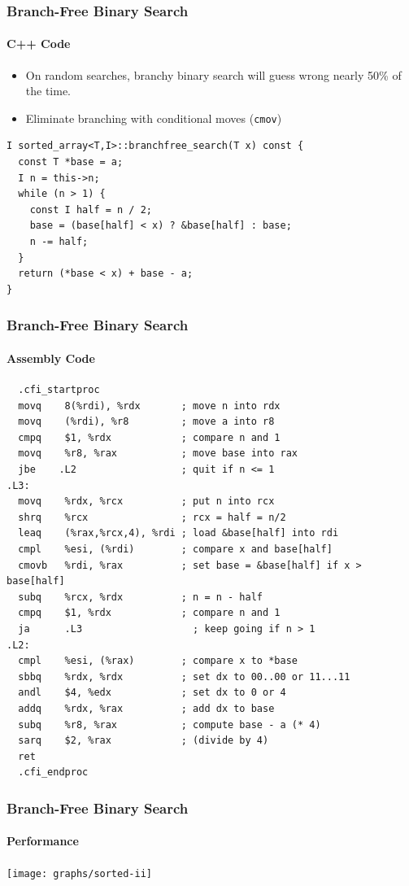 \documentclass[xcolor=dvipsnames]{beamer}
\begin{document}
\begin{frame}[fragile]
   \frametitle{Branch-Free Binary Search}
   \framesubtitle{C++ Code}

   \begin{itemize}
       \item On random searches, branchy binary search will guess 
                wrong nearly 50\% of the time.
       \item Eliminate branching with conditional moves (\texttt{\color{blue}cmov})
   \end{itemize}
\begin{verbatim}
I sorted_array<T,I>::branchfree_search(T x) const {
  const T *base = a;
  I n = this->n;
  while (n > 1) {
    const I half = n / 2;
    base = (base[half] < x) ? &base[half] : base;
    n -= half;
  }
  return (*base < x) + base - a;
}
\end{verbatim}
\end{frame}

\begin{frame}[fragile]
   \frametitle{Branch-Free Binary Search}
   \framesubtitle{Assembly Code}

\tiny
\begin{verbatim}
  .cfi_startproc
  movq    8(%rdi), %rdx       ; move n into rdx
  movq    (%rdi), %r8         ; move a into r8
  cmpq    $1, %rdx            ; compare n and 1
  movq    %r8, %rax           ; move base into rax
  jbe    .L2                  ; quit if n <= 1
.L3:
  movq    %rdx, %rcx          ; put n into rcx
  shrq    %rcx                ; rcx = half = n/2
  leaq    (%rax,%rcx,4), %rdi ; load &base[half] into rdi
  cmpl    %esi, (%rdi)        ; compare x and base[half]
  cmovb   %rdi, %rax          ; set base = &base[half] if x > base[half]
  subq    %rcx, %rdx          ; n = n - half
  cmpq    $1, %rdx            ; compare n and 1
  ja      .L3                   ; keep going if n > 1
.L2:
  cmpl    %esi, (%rax)        ; compare x to *base
  sbbq    %rdx, %rdx          ; set dx to 00..00 or 11...11
  andl    $4, %edx            ; set dx to 0 or 4 
  addq    %rdx, %rax          ; add dx to base
  subq    %r8, %rax           ; compute base - a (* 4)
  sarq    $2, %rax            ; (divide by 4)
  ret
  .cfi_endproc
\end{verbatim}
\end{frame}

\begin{frame}[fragile]
   \frametitle{Branch-Free Binary Search}
   \framesubtitle{Performance}

   \begin{center}
     \texttt{[image: graphs/sorted-ii]}
   \end{center}
\end{frame}
\end{document}

